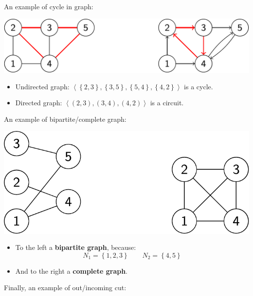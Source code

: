 \begin{examplebox}
    An example of cycle in graph:
    
    \begin{center}
        \includegraphics[width=.8\textwidth]{img/graphs-4.pdf}
    \end{center}

    \begin{itemize}
        \item Undirected graph: $\left\langle \left\{2,3\right\}, \left\{3,5\right\}, \left\{5,4\right\}, \left\{4,2\right\} \right\rangle$ is a cycle.
        \item Directed graph: $\left\langle \left(2,3\right), \left(3,4\right), \left(4,2\right) \right\rangle$ is a circuit.
    \end{itemize}

    An example of bipartite/complete graph:

    \begin{center}
        \includegraphics[width=.6\textwidth]{img/graphs-5.pdf}
    \end{center}

    \begin{itemize}
        \item To the left a \textbf{bipartite graph}, because:
        \begin{equation*}
            N_{1} = \left\{1,2,3\right\} \hspace{2em} N_{2} = \left\{4,5\right\}
        \end{equation*}
        \item And to the right a \textbf{complete graph}.
    \end{itemize}

    Finally, an example of out/incoming cut:
    

\end{examplebox}
